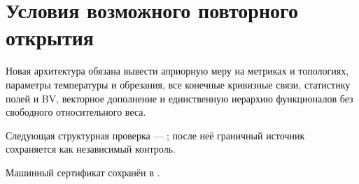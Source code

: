 \section{Условия возможного повторного открытия}

Новая архитектура обязана вывести априорную меру на метриках и топологиях,
параметры температуры и обрезания, все конечные кривизные связи, статистику
полей и BV, векторное дополнение и единственную иерархию функционалов без
свободного относительного веса.

Следующая структурная проверка ---
; после неё
граничный источник сохраняется как независимый контроль.

Машинный сертификат сохранён в
.